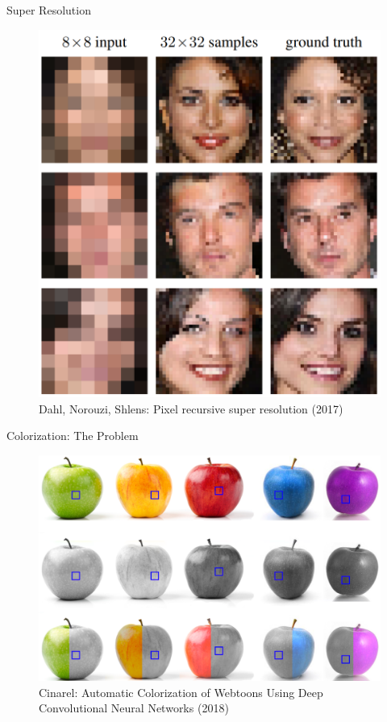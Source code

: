 \documentclass{beamer}
\begin{document}
\begin{frame}{Super Resolution}
\begin{figure}[ht]
    \centering
    \includegraphics[width=0.8\paperwidth, height=0.7\paperheight, keepaspectratio]{graphics/pixel-recursive-super-resolution.png}
    \captionsetup{labelformat=empty}
    \caption{Dahl, Norouzi, Shlens: Pixel recursive super resolution (2017)}
\end{figure}
\end{frame}


\begin{frame}{Colorization: The Problem}
\begin{figure}[ht]
    \centering
    \includegraphics[width=0.8\paperwidth, height=0.7\paperheight, keepaspectratio]{graphics/multimodality-apple.png}
    \captionsetup{labelformat=empty}
    \caption{Cinarel: Automatic Colorization of Webtoons Using Deep Convolutional Neural Networks (2018)}
\end{figure}
\end{frame}
\end{document}
